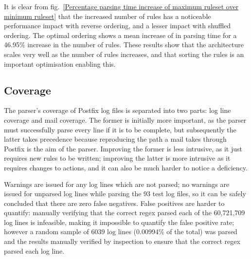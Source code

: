 \documentclass[draft]{svmult}
\newcommand{\refwithlabel}[2]{%
    #1~\vref{#2}%
}
\newcommand{\graphref}[1]{%
    \refwithlabel{fig.}{#1}%
}
\newcommand{\numberOFlogFILES}[0]{%
    93%
}
\newcommand{\numberOFrulesMAXIMUMpercentage}[0]{%
    46.95\%%
}
\newcommand{\numberOFlogLINES}[0]{%
    60,721,709%
}
\begin{document}
It is clear from \graphref{Percentage parsing time increase of maximum
ruleset over minimum ruleset} that the increased number of rules has a
noticeable performance impact with reverse ordering, and a lesser impact
with shuffled ordering.  The optimal ordering shows a mean increase of
 in parsing time for a
\numberOFrulesMAXIMUMpercentage{} increase in the number of rules.  These
results show that the architecture scales very well as the number of rules
increases, and that sorting the rules is an important optimisation enabling
this.

\subsection{Coverage}

\label{coverage}

The parser's coverage of Postfix log files is separated into two parts: log
line coverage and mail coverage.  The former is initially more important,
as the parser must successfully parse every line if it is to be complete,
but subsequently the latter takes precedence because reproducing the path a
mail takes through Postfix is the aim of the parser.  Improving the former
is less intrusive, as it just requires new rules to be written; improving
the latter is more intrusive as it requires changes to actions, and it can
also be much harder to notice a deficiency.

Warnings are issued for any log lines which are not parsed; no
warnings are issued for unparsed log lines while parsing the
\numberOFlogFILES{} test log files, so it can be safely concluded that
there are zero false negatives.  False positives are harder to quantify:
manually verifying that the correct regex parsed each of the
\numberOFlogLINES{} log lines is infeasible, making it impossible to
quantify the false positive rate; however a random sample of 6039 log lines
(0.00994\% of the total) was parsed and the results manually verified by
inspection to ensure that the correct regex parsed each log line.
\end{document}
